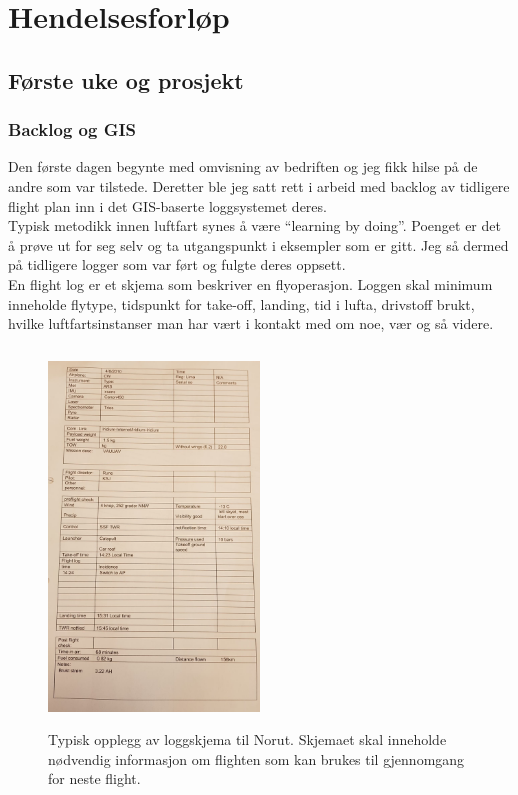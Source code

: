 \documentclass[12pt, a4paper]{article}
\begin{document}
\newpage
\section{Hendelsesforløp}
\subsection{Første uke og prosjekt}
\subsubsection{Backlog og GIS}
Den første dagen begynte med omvisning av bedriften og jeg fikk hilse på de andre som var tilstede. Deretter ble jeg satt rett i arbeid med backlog av tidligere flight plan inn i det GIS-baserte loggsystemet deres. \\
Typisk metodikk innen luftfart synes å være ``learning by doing''. Poenget er det å prøve ut for seg selv og ta utgangspunkt i eksempler som er gitt. Jeg så dermed på tidligere logger som var ført og fulgte deres oppsett.\\
En flight log er et skjema som beskriver en flyoperasjon. Loggen skal minimum inneholde flytype, tidspunkt for take-off, landing, tid i lufta, drivstoff brukt, hvilke luftfartsinstanser man har vært i kontakt med om noe, vær og så videre. 

\begin{figure}[ht]
	\centering
	\includegraphics[height= 10cm, width=0.5\textwidth]{bilder/flightlogNorut.png}
		\caption[Loggskjema]{Typisk opplegg av loggskjema til Norut. Skjemaet skal inneholde nødvendig informasjon om flighten som kan brukes til gjennomgang for neste flight. }
\end{figure}
\end{document}
